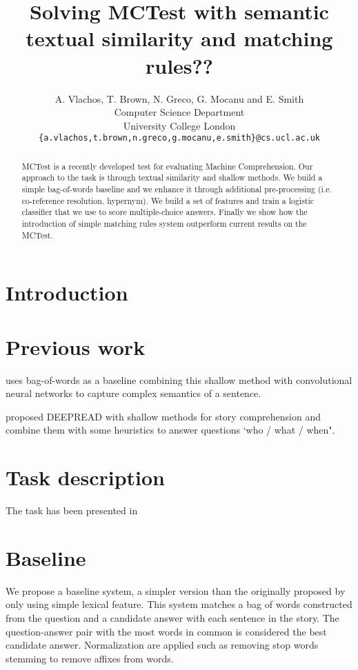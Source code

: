 \documentclass[11pt]{article}
\title{Solving MCTest with semantic textual similarity and matching rules??}
\author
       {A. Vlachos, T. Brown, N. Greco, G. Mocanu and E. Smith
       \\
       Computer Science Department\\
  University College London\\
       \tt{\{a.vlachos,t.brown,n.greco,g.mocanu,e.smith\}@cs.ucl.ac.uk}\\ 
       }
\date{}
\begin{document}
\maketitle
\begin{abstract}
MCTest is a recently developed test for evaluating Machine Comprehension.
Our approach to the task is through textual similarity and shallow methods.
We build a simple bag-of-words baseline and we enhance it through additional pre-processing (i.e. co-reference resolution, hypernym).
We build a set of features and train a logistic classifier that we use to score multiple-choice answers.
Finally we show how the introduction of simple matching rules system outperform current results on the MCTest.
\end{abstract}

\section{Introduction}

\section{Previous work}

 uses bag-of-words as a baseline combining this shallow method with convolutional neural networks to capture complex semantics of a sentence.

 proposed D{\small EEP}R{\small EAD} with shallow methods for story comprehension and combine them with some heuristics to answer questions `who / what / when".

\section{Task description}

The task has been presented in  \cite{mctest}

\section{Baseline}
We propose a baseline system, a simpler version than the originally proposed by  only using simple lexical feature.
This system matches a bag of words constructed from the question and a candidate answer with each sentence in the story.
The question-answer pair with the most words in common is considered the best candidate answer.
Normalization are applied such as removing stop words stemming to remove affixes from words.
\end{document}
